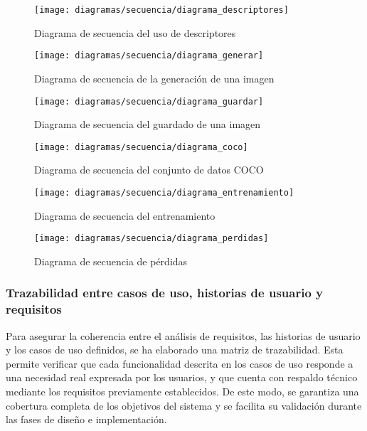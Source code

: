 \begin{figure}[H]
    \centering
    \texttt{[image: diagramas/secuencia/diagrama\_descriptores]}
    \caption{Diagrama de secuencia del uso de descriptores}
    \label{fig:diagrama-descriptores}
\end{figure}

\begin{figure}[H]
    \centering
    \texttt{[image: diagramas/secuencia/diagrama\_generar]}
    \caption{Diagrama de secuencia de la generación de una imagen}
    \label{fig:diagrama-generar}
\end{figure}

\begin{figure}[H]
    \centering
    \texttt{[image: diagramas/secuencia/diagrama\_guardar]}
    \caption{Diagrama de secuencia del guardado de una imagen}
    \label{fig:diagrama-guardar}
\end{figure}

\begin{figure}[H]
    \centering
    \texttt{[image: diagramas/secuencia/diagrama\_coco]}
    \caption{Diagrama de secuencia del conjunto de datos COCO}
    \label{fig:diagrama-coco}
\end{figure}

\begin{figure}[H]
    \centering
    \texttt{[image: diagramas/secuencia/diagrama\_entrenamiento]}
    \caption{Diagrama de secuencia del entrenamiento}
    \label{fig:diagrama-secuencia-entrenamiento}
\end{figure}

\begin{figure}[H]
    \centering
    \texttt{[image: diagramas/secuencia/diagrama\_perdidas]}
    \caption{Diagrama de secuencia de pérdidas}
    \label{fig:diagrama-secuencia-perdidas}
\end{figure}

\subsubsection{Trazabilidad entre casos de uso, historias de usuario y requisitos}
Para asegurar la coherencia entre el análisis de requisitos, las historias de usuario y los casos de uso definidos, se ha elaborado una matriz de trazabilidad. Esta permite verificar que cada funcionalidad descrita en los casos de uso responde a una necesidad real expresada por los usuarios, y que cuenta con respaldo técnico mediante los requisitos previamente establecidos. De este modo, se garantiza una cobertura completa de los objetivos del sistema y se facilita su validación durante las fases de diseño e implementación.


